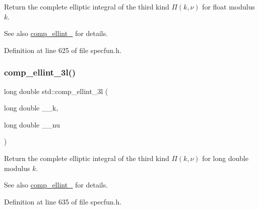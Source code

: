 Return the complete elliptic integral of the third kind $ \Pi(k,\nu) $ for {\ttfamily float} modulus $ k $. 

\begin{DoxySeeAlso}{See also}
\hyperlink{group__tr29124__math__spec__func_ga80419d323d3231870bd588525e818974}{comp\+\_\+ellint\+\_} for details. 
\end{DoxySeeAlso}


Definition at line 625 of file specfun.\+h.

\mbox{\label{group__tr29124__math__spec__func_ga1ca081fee102cd0d4d6b091285e495e5}} 
\subsubsection{\texorpdfstring{comp\+\_\+ellint\+\_\+3l()}{comp\_ellint\_3l()}}
{\footnotesize\ttfamily long double std\+::comp\+\_\+ellint\+\_\+3l (\begin{DoxyParamCaption}\item[{long double}]{\+\_\+\+\_\+k,  }\item[{long double}]{\+\_\+\+\_\+nu }\end{DoxyParamCaption})\hspace{0.3cm}{\ttfamily [inline]}}



Return the complete elliptic integral of the third kind $ \Pi(k,\nu) $ for {\ttfamily long double} modulus $ k $. 

\begin{DoxySeeAlso}{See also}
\hyperlink{group__tr29124__math__spec__func_ga80419d323d3231870bd588525e818974}{comp\+\_\+ellint\+\_} for details. 
\end{DoxySeeAlso}


Definition at line 635 of file specfun.\+h.

\mbox{\label{group__tr29124__math__spec__func_ga29504b6008798072b0b8d6ea5a50ec60}} 
